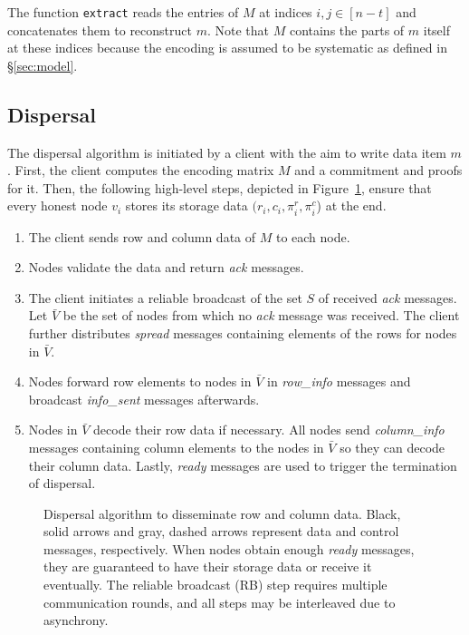 \documentclass[sigconf,screen]{acmart}
\begin{document}
The function \texttt{extract} reads the entries of $M$ at indices $i,j \in [n-t]$ and concatenates them to reconstruct $m$. Note that $M$ contains the parts of $m$ itself at these indices because the encoding is assumed to be systematic as defined in \S\ref{sec:model}.

\subsection{Dispersal}
\label{sec:dispersal}

The dispersal algorithm is initiated by a client with the aim to write data item $m$. First, the client computes the encoding matrix $M$ and a commitment and proofs for it. Then, the following high-level steps, depicted in Figure~\ref{fig:dispersal}, ensure that every honest node $v_i$ stores its storage data $(r_i, c_i, \pi_i^r, \pi_i^c$) at the end.
\begin{enumerate}
\item The client sends row and column data of $M$ to each node.
\item Nodes validate the data and return \emph{ack} messages.
\item The client initiates a reliable broadcast of the set $S$ of received \emph{ack} messages. Let $\bar{V}$ be the set of nodes from which no \emph{ack} message was received. The client further distributes \emph{spread} messages containing elements of the rows for nodes in $\bar{V}$.  
\item Nodes forward row elements to nodes in $\bar{V}$ in \emph{row\_info} messages and broadcast \emph{info\_sent} messages afterwards.
\item Nodes in $\bar{V}$ decode their row data if necessary. All nodes send
\emph{column\_info} messages containing column elements to the nodes in $\bar{V}$ so they can decode their column data. Lastly, \emph{ready} messages are used to trigger the termination of dispersal.
\end{enumerate}

\begin{figure}[t]
\centering
\footnotesize
{}
\vspace{-.8cm}
\caption{
	Dispersal algorithm to disseminate row and column data.
	Black, solid arrows and gray, dashed arrows represent data and control messages, respectively.
	When nodes obtain enough \emph{ready} messages, they are guaranteed to have their storage data or receive it eventually.
	The reliable broadcast (RB) step requires multiple communication rounds, and all steps may be interleaved due to asynchrony.
}\label{fig:dispersal}
\end{figure}
\end{document}
